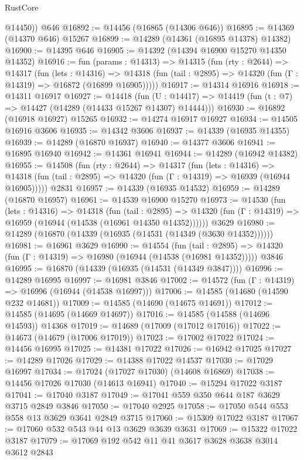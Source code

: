 \begin{lexlean}{RustCore}
\begin{coremodule}
        @14450))
    @646
@16892 := @14456 (@16865 (@14306 @646))
@16895 := @14369 (@14370 @646) @15267
@16899 := @14289 (@14361 (@16895 @14378) @14382)
@16900 := @14395 @646
@16905 := @14392 (@14394 @16900 @15270 @14350 @14352)
@16916 := fun (params : @14313) =>
  @14315
    (fun (rty : @2644) =>
    @14317
      (fun (lets : @14316) =>
      @14318 (fun (tail : @2895) => @14320 (fun (Γ : @14319) => @16872 (@16899 @16905)))))
@16917 := @14314 @16916
@16918 := @14311 @16917
@16927 := @14418
    (fun (U : @14417) => @14419 (fun (t : @7) => @14427 (@14289 (@14433 @15267 @14307) @14444)))
@16930 := @16892 (@16918 @16927) @15265
@16932 := @14274 @16917 @16927
@16934 := @14505 @16916 @3606
@16935 := @14342 @3606
@16937 := @14339 (@16935 @14355)
@16939 := @14289 (@16870 @16937)
@16940 := @14377 @3606
@16941 := @16895 @16940
@16942 := @14361 @16941
@16944 := @14289 (@16942 @14382)
@16955 := @14508
    (fun (rty : @2644) =>
    @14317
      (fun (lets : @14316) =>
      @14318 (fun (tail : @2895) => @14320 (fun (Γ : @14319) => @16939 (@16944 @16905)))))
    @2831
@16957 := @14339 (@16935 @14532)
@16959 := @14289 (@16870 @16957)
@16961 := @14539 @16900 @15270
@16973 := @14530
    (fun (lets : @14316) =>
    @14318
      (fun (tail : @2895) =>
      @14320 (fun (Γ : @14319) => @16959 (@16944 (@14538 (@16961 @14350 @14352))))))
    @3629
@16980 := @14289 (@16870 (@14339 (@16935 (@14531 (@14349 (@3630 @14352))))))
@16981 := @16961 @3629
@16990 := @14554
    (fun (tail : @2895) => @14320 (fun (Γ : @14319) => @16980 (@16944 (@14538 (@16981 @14352)))))
    @3846
@16995 := @16870 (@14339 (@16935 (@14531 (@14349 @3847))))
@16996 := @14289 @16995
@16997 := @16981 @3846
@17002 := @14572 (fun (Γ : @14319) => @16996 (@16944 (@14538 @16997)))
@17006 := @14585 (@14680 (@14590 @232 @14681))
@17009 := @14585 (@14690 (@14675 @14691))
@17012 := @14585 (@14695 (@14669 @14697))
@17016 := @14585 (@14588 (@14696 @14593)) @14368
@17019 := @14689 (@17009 (@17012 @17016))
@17022 := @14673 (@14679 (@17006 @17019))
@17023 := @17002 @17022
@17024 := @14456 @16995
@17025 := @14381 @17022
@17026 := @16942 @17025
@17027 := @14289 @17026
@17029 := @14388 @17022 @14537
@17030 := @17029 @16997
@17034 := @17024 (@17027 @17030) (@14608 @16869)
@17038 := @14456 @17026 @17030 (@14613 @16941)
@17040 := @15294 @17022 @3187
@17041 := @17040 @3187
@17049 := @17041 @559 @350 @644 @187 @3629 @3715 @2849 @3846
@17050 := @17040 @2925
@17058 := @17050 @544 @553 @558 @13 @3629 @3641 @2849 @3715
@17060 := @15309 @17022 @3187
@17067 := @17060 @532 @543 @44 @13 @3629 @3639 @3631
@17069 := @15322 @17022 @3187
@17079 := @17069 @192 @542 @11 @41 @3617 @3628 @3638 @3014 @3612 @2843

\end{coremodule}
\end{lexlean}
